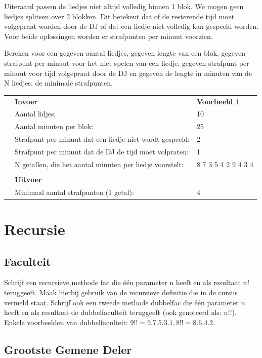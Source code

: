 Uiteraard passen de liedjes niet altijd volledig binnen 1 blok. We mogen geen liedjes splitsen over 2 blokken. Dit betekent dat of de resterende tijd moet volgepraat worden door de DJ of dat een liedje niet volledig kan gespeeld worden. Voor beide oplossingen worden er strafpunten per minuut voorzien.

Bereken voor een gegeven aantal liedjes, gegeven lengte van een blok, gegeven strafpunt per minuut voor het niet spelen van een liedje, gegeven strafpunt  per minuut voor tijd volgepraat door de DJ en gegeven de lengte in minuten van de N liedjes, de minimale strafpunten.

\begin{tabular}{ p{5 mm} l l }
 & \textbf{Invoer} & \textbf{Voorbeeld 1} \\
 & Aantal lidjes: & 10 \\
 & Aantal minuten per blok: & 25 \\
 & Strafpunt per minuut dat een liedje niet wordt gespeeld: & 2 \\
 & Strafpunt per minuut dat de DJ de tijd moet volpraten: & 1 \\
 & N getallen, die het aantal minuten per liedje voorstelt: & 8 7 3 5 4 2 9 4 3 4 \\
 & & \\
 & \textbf{Uitvoer} & \\
 & Minimaal aantal strafpunten (1 getal): & 4 \\
\end{tabular}

\section{Recursie}

\subsection{Faculteit}

Schrijf een recursieve methode fac die \'e\'en parameter n heeft en als resultaat $n!$ teruggeeft. Maak hierbij gebruik van de recursieve definitie die in de cursus vermeld staat. Schrijf ook een tweede methode dubbelfac die \'e\'en parameter $n$ heeft en als resultaat de dubbelfaculteit teruggeeft (ook genoteerd als: $n!!$). Enkele voorbeelden van dubbelfaculteit: $9!! = 9.7.5.3.1, 8!! = 8.6.4.2$.

\subsection{Grootste Gemene Deler}

